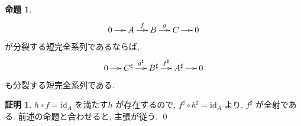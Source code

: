 \documentclass[10pt, fleqn, label-section=none]{bxjsarticle}
\theoremstyle{definition}
\newtheorem{prop}[dfn]{命題}
\newtheorem*{pf*}{証明}
\renewcommand{\;}{\, ; \,}
\begin{document}
\begin{prop}
\begin{align*}  \xymatrix@C=13pt{ 0 \ar[r] & A \ar[r]^f &B \ar[r]^g &C \ar[r] & 0}   \end{align*}
が分裂する短完全系列であるならば, 
\begin{align*} \xymatrix@C=13pt{0 \ar[r] & C^\sharp \ar[r]^{g^\sharp}  & B^\sharp \ar[r]^{f^\sharp}   &A^\sharp \ar[r] &0  }  \end{align*}
も分裂する短完全系列である. 
\end{prop}
\begin{pf*}
$h \circ f = \textrm{id}_A$ を満たす$h$ が存在するので, $f ^\sharp \circ h^\sharp = \textrm{id}_A$ より, $f^\sharp $ が全射である. 前述の命題と合わせると, 主張が従う.
\qed
\end{pf*}
\end{document}
